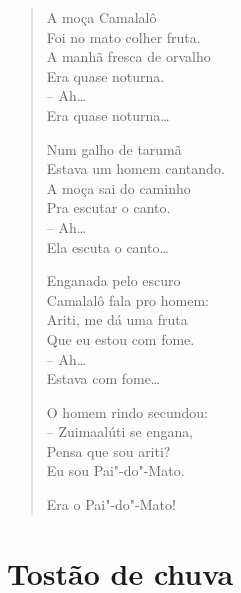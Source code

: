 \begin{verse}
A moça Camalalô\\
Foi no mato colher fruta.\\
A manhã fresca de orvalho\\
Era quase noturna.\\
\qquad-- Ah\ldots{}\\
Era quase noturna\ldots{}

Num galho de tarumã\\
Estava um homem cantando.\\
A moça sai do caminho\\
Pra escutar o canto.\\
\qquad-- Ah\ldots{}\\
Ela escuta o canto\ldots{}

Enganada pelo escuro\\
Camalalô fala pro homem:\\
Ariti, me dá uma fruta\\
Que eu estou com fome.\\
\qquad-- Ah\ldots{}\\
Estava com fome\ldots{}

O homem rindo secundou:\\
-- Zuimaalúti se engana,\\
Pensa que sou ariti?\\
Eu sou Pai"-do"-Mato.

Era o Pai"-do"-Mato!
\end{verse}

\pagebreak
{}
\section*{Tostão de chuva}

